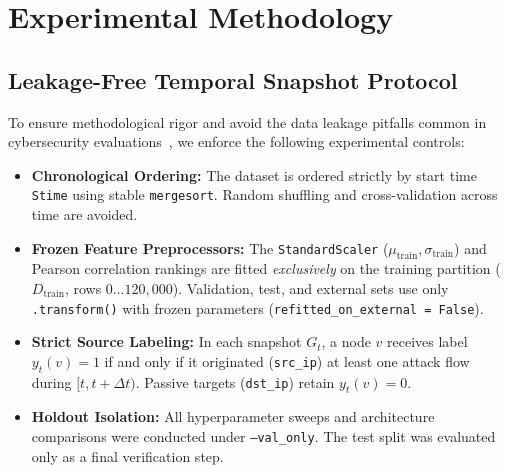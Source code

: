 \documentclass[conference]{IEEEtran}
\begin{document}
\section{Experimental Methodology}

\subsection{Leakage-Free Temporal Snapshot Protocol}
To ensure methodological rigor and avoid the data leakage pitfalls common in cybersecurity evaluations~\cite{arp2022dos}, we enforce the following experimental controls:
\begin{itemize}
    \item \textbf{Chronological Ordering:} The dataset is ordered strictly by start time \texttt{Stime} using stable \texttt{mergesort}. Random shuffling and cross-validation across time are avoided.
    \item \textbf{Frozen Feature Preprocessors:} The \texttt{StandardScaler} ($\mu_{\text{train}}, \sigma_{\text{train}}$) and Pearson correlation rankings are fitted \textit{exclusively} on the training partition ($D_{\text{train}}$, rows $0 \dots 120{,}000$). Validation, test, and external sets use only \texttt{.transform()} with frozen parameters (\texttt{refitted\_on\_external = False}).
    \item \textbf{Strict Source Labeling:} In each snapshot $G_t$, a node $v$ receives label $y_t(v) = 1$ if and only if it originated (\texttt{src\_ip}) at least one attack flow during $[t, t + \Delta t)$. Passive targets (\texttt{dst\_ip}) retain $y_t(v) = 0$.
    \item \textbf{Holdout Isolation:} All hyperparameter sweeps and architecture comparisons were conducted under \texttt{--val\_only}. The test split was evaluated only as a final verification step.
\end{itemize}
\end{document}
